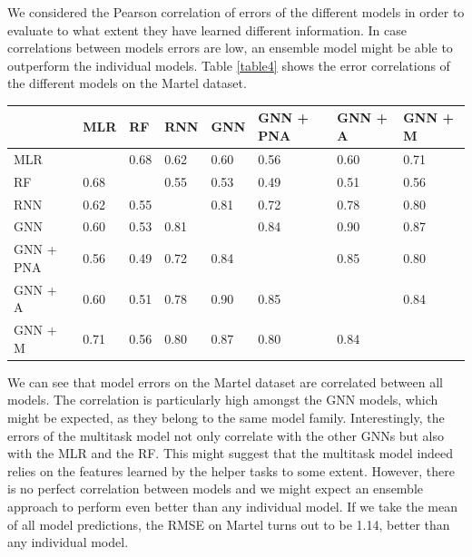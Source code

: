 \documentclass{article}
\begin{document}
We considered the Pearson correlation of errors of the different models in order to evaluate to what extent they have learned different information. In case correlations between models errors are low, an ensemble model might be able to outperform the individual models. Table \ref{table4} shows the error correlations of the different models on the Martel dataset.\\

\begin{center}
\begin{tabular}{ | m{0.8cm} | m{0.8cm}| m{0.8cm}| m{0.8cm}| m{0.8cm}| m{0.8cm}| m{0.8cm}| m{0.8cm}| } 
  \hline
   & MLR & RF & RNN & GNN & GNN + PNA & GNN + A & GNN + M \\ 
  \hline
   MLR &  & 0.68 & 0.62 & 0.60 & 0.56 & 0.60 & 0.71 \\ 
  \hline
  RF & 0.68 &  & 0.55 & 0.53 & 0.49 & 0.51 & 0.56 \\ 
  \hline
  RNN & 0.62 & 0.55 &  & 0.81 & 0.72 & 0.78 & 0.80 \\ 
  \hline
  GNN & 0.60 & 0.53 & 0.81 &  & 0.84 & 0.90 & 0.87\\ 
  \hline
  GNN + PNA & 0.56 & 0.49 & 0.72 & 0.84 &  & 0.85 & 0.80\\ 
  \hline
  GNN + A & 0.60 & 0.51 & 0.78 & 0.90 & 0.85 &  & 0.84\\ 
  \hline
  GNN + M & 0.71 & 0.56 & 0.80 & 0.87 & 0.80 & 0.84 & \\ 
  \hline

\end{tabular}
\captionsetup{width=0.8\textwidth}
\label{table4}
\end{center}

We can see that model errors on the Martel dataset are correlated between all models. The correlation is particularly high amongst the GNN models, which might be expected, as they belong to the same model family. Interestingly, the errors of the multitask model not only correlate with the other GNNs but also with the MLR and the RF. This might suggest that the multitask model indeed relies on the features learned by the helper tasks to some extent. However, there is no perfect correlation between models and we might expect an ensemble approach to perform even better than any individual model. If we take the mean of all model predictions, the RMSE on Martel turns out to be 1.14, better than any individual model. \\
\end{document}

